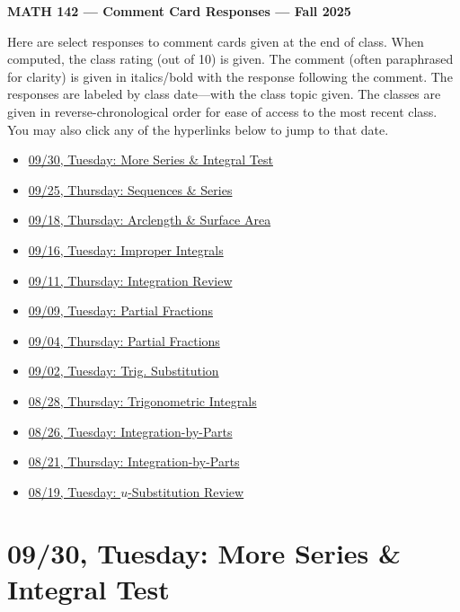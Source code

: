 \documentclass[11pt,letterpaper]{article}
\begin{document}
\begin{center} {\bfseries \LARGE MATH 142 --- Comment Card Responses --- Fall 2025} \end{center}

Here are select responses to comment cards given at the end of class. When computed, the class rating (out of 10) is given. The comment (often paraphrased for clarity) is given in italics/bold with the response following the comment. The responses are labeled by class date---with the class topic given. The classes are given in reverse-chronological order for ease of access to the most recent class. You may also click any of the hyperlinks below to jump to that date.

\begin{itemize}
\item \hyperref[09-30]{09/30, Tuesday: More Series \& Integral Test}
\item \hyperref[09-25]{09/25, Thursday: Sequences \& Series}
\item \hyperref[09-18]{09/18, Thursday: Arclength \& Surface Area}
\item \hyperref[09-16]{09/16, Tuesday: Improper Integrals}
\item \hyperref[09-11]{09/11, Thursday: Integration Review}
\item \hyperref[09-09]{09/09, Tuesday: Partial Fractions}
\item \hyperref[09-04]{09/04, Thursday: Partial Fractions}
\item \hyperref[09-02]{09/02, Tuesday: Trig. Substitution}
\item \hyperref[08-28]{08/28, Thursday: Trigonometric Integrals}
\item \hyperref[08-26]{08/26, Tuesday: Integration-by-Parts}
\item \hyperref[08-21]{08/21, Thursday: Integration-by-Parts}
\item \hyperref[08-19]{08/19, Tuesday: $u$-Substitution Review}
\end{itemize}

\newpage
\section*{09/30, Tuesday: More Series \& Integral Test\label{09-30}}
\end{document}
